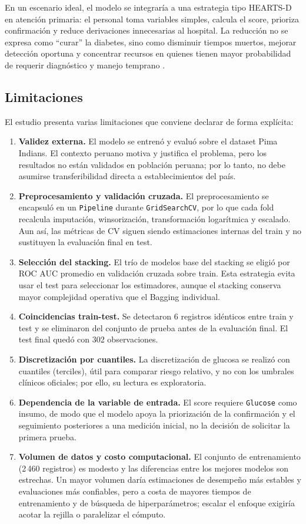 \documentclass[conference]{IEEEtran}
\newcommand{\code}[1]{\texttt{#1}}
\begin{document}
En un escenario ideal, el modelo se integraría a una estrategia tipo HEARTS-D en atención primaria: el personal toma variables simples, calcula el score, prioriza confirmación y reduce derivaciones innecesarias al hospital. La reducción no se expresa como ``curar'' la diabetes, sino como disminuir tiempos muertos, mejorar detección oportuna y concentrar recursos en quienes tienen mayor probabilidad de requerir diagnóstico y manejo temprano \cite{ops2024}.

\subsection{Limitaciones}

El estudio presenta varias limitaciones que conviene declarar de forma explícita:

\begin{enumerate}[leftmargin=1.3em,itemsep=1pt]
  \item \textbf{Validez externa.} El modelo se entrenó y evaluó sobre el dataset Pima Indians. El contexto peruano motiva y justifica el problema, pero los resultados no están validados en población peruana; por lo tanto, no debe asumirse transferibilidad directa a establecimientos del país.
  \item \textbf{Preprocesamiento y validación cruzada.} El preprocesamiento se encapsuló en un \code{Pipeline} durante \code{GridSearchCV}, por lo que cada fold recalcula imputación, winsorización, transformación logarítmica y escalado. Aun así, las métricas de CV siguen siendo estimaciones internas del train y no sustituyen la evaluación final en test.
  \item \textbf{Selección del stacking.} El trío de modelos base del stacking se eligió por ROC AUC promedio en validación cruzada sobre train. Esta estrategia evita usar el test para seleccionar los estimadores, aunque el stacking conserva mayor complejidad operativa que el Bagging individual.
  \item \textbf{Coincidencias train-test.} Se detectaron 6 registros idénticos entre train y test y se eliminaron del conjunto de prueba antes de la evaluación final. El test final quedó con 302 observaciones.
  \item \textbf{Discretización por cuantiles.} La discretización de glucosa se realizó con cuantiles (terciles), útil para comparar riesgo relativo, y no con los umbrales clínicos oficiales; por ello, su lectura es exploratoria.
  \item \textbf{Dependencia de la variable de entrada.} El score requiere \code{Glucose} como insumo, de modo que el modelo apoya la priorización de la confirmación y el seguimiento posteriores a una medición inicial, no la decisión de solicitar la primera prueba.
  \item \textbf{Volumen de datos y costo computacional.} El conjunto de entrenamiento (2\,460 registros) es modesto y las diferencias entre los mejores modelos son estrechas. Un mayor volumen daría estimaciones de desempeño más estables y evaluaciones más confiables, pero a costa de mayores tiempos de entrenamiento y de búsqueda de hiperparámetros; escalar el enfoque exigiría acotar la rejilla o paralelizar el cómputo.
\end{enumerate}
\end{document}
